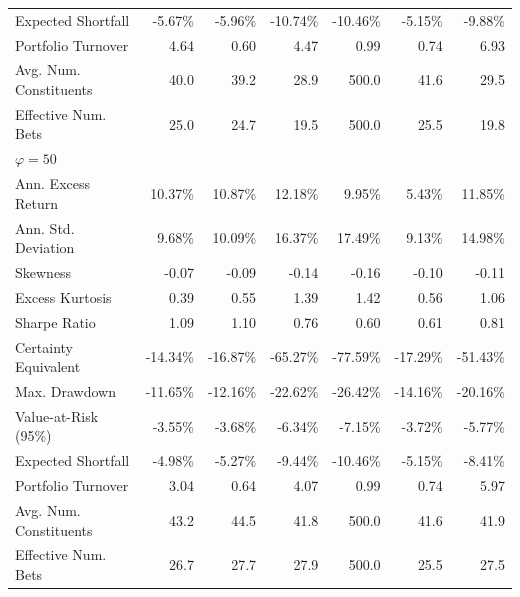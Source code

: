 \begin{tabular*}{\textwidth}{l@{\extracolsep{\fill}}rrrrrr}
Expected Shortfall & -5.67\% & -5.96\% & -10.74\% & -10.46\% & -5.15\% & -9.88\% \\
Portfolio Turnover & 4.64 & 0.60 & 4.47 & 0.99 & 0.74 & 6.93 \\
Avg. Num. Constituents & 40.0 & 39.2 & 28.9 & 500.0 & 41.6 & 29.5 \\
Effective Num. Bets & 25.0 & 24.7 & 19.5 & 500.0 & 25.5 & 19.8 \\
\midrule
\multicolumn{7}{l}{\textit{$\varphi = 50$}} \\
\midrule
Ann. Excess Return & 10.37\% & 10.87\% & 12.18\% & 9.95\% & 5.43\% & 11.85\% \\
Ann. Std. Deviation & 9.68\% & 10.09\% & 16.37\% & 17.49\% & 9.13\% & 14.98\% \\
Skewness & -0.07 & -0.09 & -0.14 & -0.16 & -0.10 & -0.11 \\
Excess Kurtosis & 0.39 & 0.55 & 1.39 & 1.42 & 0.56 & 1.06 \\
Sharpe Ratio & 1.09 & 1.10 & 0.76 & 0.60 & 0.61 & 0.81 \\
Certainty Equivalent & -14.34\% & -16.87\% & -65.27\% & -77.59\% & -17.29\% & -51.43\% \\
Max. Drawdown & -11.65\% & -12.16\% & -22.62\% & -26.42\% & -14.16\% & -20.16\% \\
Value-at-Risk (95\%) & -3.55\% & -3.68\% & -6.34\% & -7.15\% & -3.72\% & -5.77\% \\
Expected Shortfall & -4.98\% & -5.27\% & -9.44\% & -10.46\% & -5.15\% & -8.41\% \\
Portfolio Turnover & 3.04 & 0.64 & 4.07 & 0.99 & 0.74 & 5.97 \\
Avg. Num. Constituents & 43.2 & 44.5 & 41.8 & 500.0 & 41.6 & 41.9 \\
Effective Num. Bets & 26.7 & 27.7 & 27.9 & 500.0 & 25.5 & 27.5 \\
\bottomrule
\end{tabular*}
